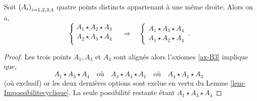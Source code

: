 \begin{cor}\label{cor-configurationordrequatrepoint-1}
Soit $\left(A_{i}\right)_{i = 1,2,3,4}$ quatre points distincts appartenant à une même droite. Alors on a,
        \begin{equation*}
        \left\{
            \begin{array}{c}
                 A_{1} \star A_{2} \star A_{3} \\
                 A_{2} \star A_{3} \star A_{4}\\
            \end{array}
            \right. \quad \Longrightarrow \quad \left\{
            \begin{array}{c}
                A_1 \star A_3 \star A_4\\
                A_1 \star A_2 \star A_4
            \end{array}
            \right.\,.
    \end{equation*}
    \begin{proof}
        Les trois points $A_1,A_3$ et $A_4$ sont alignés alors l'axiomes \ref{ax-B3} implique que,
        \begin{equation*}
            A_1 \star A_3 \star A_4 \quad\text{où}\quad A_3 \star A_4 \star A_1 \quad\text{où}\quad A_4 \star A_1 \star A_3 
        \end{equation*}
        (où exclusif) or les deux dernières options sont exclue en vertu du Lemme \ref{lem-Impossibilitecyclique}. La seule possibilité restante étant $A_1 \star A_3 \star A_4$


\end{proof}
\end{cor}
